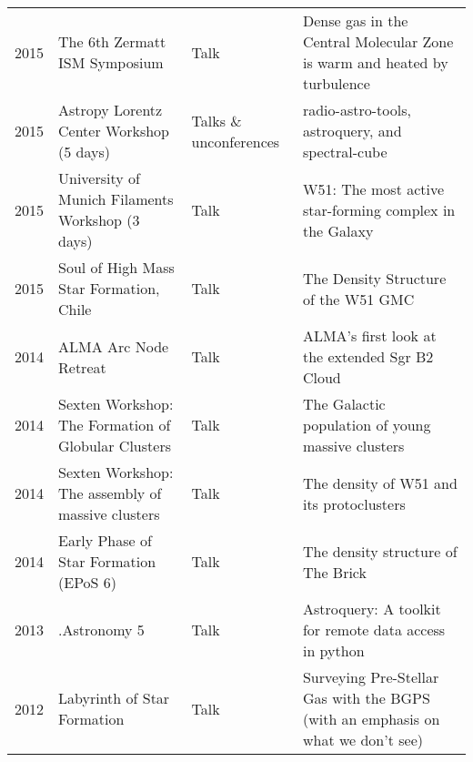 \begin{tabular}{cp{1.8in}p{1.5cm}p{3.0in}}
    2015 &      The 6th Zermatt ISM Symposium & Talk & Dense gas in the Central Molecular Zone is warm and heated by turbulence \\
    2015 &      Astropy Lorentz Center Workshop (5 days) & Talks \& unconferences & radio-astro-tools, astroquery, and spectral-cube \\ 
    2015 &      University of Munich Filaments Workshop (3 days) & Talk & W51: The most active star-forming complex in the Galaxy \\
    2015 &      Soul of High Mass Star Formation, Chile & Talk & The Density Structure of the W51 GMC \\
    2014 &      ALMA Arc Node Retreat  & Talk & ALMA's first look at the extended Sgr B2 Cloud \\
    2014 &      Sexten Workshop: The Formation of Globular Clusters  & Talk & The Galactic population of young massive clusters \\
    2014 &      Sexten Workshop: The assembly of massive clusters  & Talk & The density of W51 and its protoclusters \\
    2014 &      Early Phase of Star Formation (EPoS 6)  & Talk & The density structure of The Brick \\
    2013 &      .Astronomy 5  & Talk & Astroquery: A toolkit for remote data access in python \\
    2012 &      Labyrinth of Star Formation  &  Talk& Surveying Pre-Stellar Gas with the BGPS (with an emphasis on what we don't see) \\
\end{tabular}

